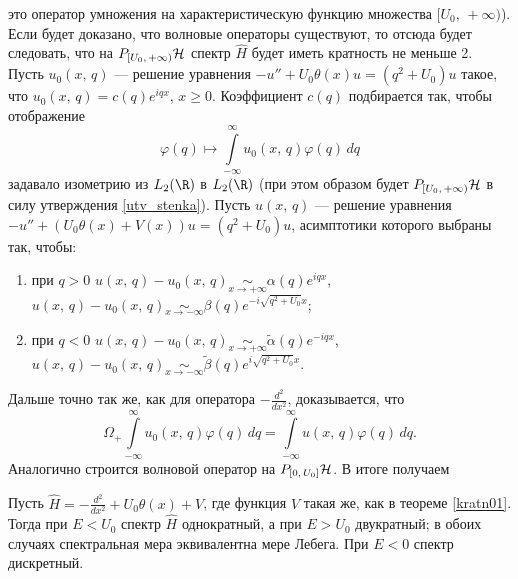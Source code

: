 \documentclass[a4paper
]{article}
\begin{document}
это оператор умножения на характеристическую функцию множества $[U_0,
\, +\infty)$). Если будет доказано, что волновые операторы существуют,
то отсюда будет следовать, что на $P_{[U_0, \, +\infty)}{\cal H}$
спектр $\hat H$ будет иметь кратность не меньше 2. Пусть $u_0(x, \, q)$
--- решение уравнения $-u''+U_0\theta(x)u=(q^2+U_0)u$ такое, что
$u_0(x, \, q)=c(q)e^{iqx}$, $x\ge 0$. Коэффициент $c(q)$ подбирается так,
чтобы отображение $$\varphi(q)\mapsto \int \limits_{-\infty}^\infty
u_0(x, \, q)\varphi(q)\, dq$$ задавало изометрию из $L_2(\R)$ в $L_2(\R)$
(при этом образом будет $P_{[U_0, \, +\infty)}{\cal H}$ в силу утверждения
\ref{utv_stenka}). Пусть $u(x, \, q)$ --- решение уравнения $-u''+
(U_0\theta(x)+V(x))u=(q^2+U_0)u$, асимптотики которого выбраны так, чтобы:
\begin{enumerate}
\item при $q>0$ $u(x, \, q)-u_0(x, \, q)\underset{x\rightarrow +\infty}{\sim}
\alpha(q)e^{iqx}$, $u(x, \, q)-u_0(x, \, q)\underset{x\rightarrow -\infty}
{\sim}\beta(q)e^{-i\sqrt{q^2+U_0}x}$;
\item при $q<0$ $u(x, \, q)-u_0(x, \, q)\underset{x\rightarrow +\infty}{\sim}
\tilde \alpha(q)e^{-iqx}$, $u(x, \, q)-u_0(x, \, q)\underset{x\rightarrow -\infty}
{\sim}\tilde \beta(q)e^{i\sqrt{q^2+U_0}x}$.
\end{enumerate}
Дальше точно так же, как для оператора $-\frac{d^2}{dx^2}$, доказывается,
что $$\Omega_+\int \limits _{-\infty}^{\infty}u_0(x, \, q)\varphi(q)\, dq
=\int \limits_{-\infty}^\infty u(x, \, q)\varphi(q)\, dq.$$
Аналогично строится волновой оператор на $P_{[0, \, U_0]}{\cal H}$.
В итоге получаем
\begin{Trm}
Пусть $\hat H=-\frac{d^2}{dx^2}+U_0\theta(x)+V$, где функция $V$ такая же,
как в теореме \ref{kratn01}. Тогда при $E<U_0$ спектр $\hat H$
однократный, а при $E>U_0$ двукратный; в обоих случаях спектральная
мера эквивалентна мере Лебега. При $E<0$ спектр дискретный.
\end{Trm}
\end{document}
